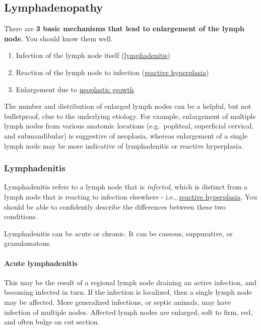 \documentclass[openany]{article}
\providecommand{\tightlist}{%
  \setlength{\itemsep}{0pt}\setlength{\parskip}{0pt}}
\let\oldparagraph\paragraph
\renewcommand{\paragraph}[1]{\oldparagraph{#1}\mbox{}}
\begin{document}
\subsection{Lymphadenopathy}\label{lymphadenopathy}

There are \textbf{3 basic mechanisms that lead to enlargement of the
lymph node}. You should know them well.

\begin{enumerate}
\def\labelenumi{\arabic{enumi}.}
\tightlist
\item
  Infection of the lymph node itself
  (\protect\hyperlink{lymphadenitis}{lymphadenitis})
\item
  Reaction of the lymph node to infection
  (\protect\hyperlink{reactive-hyperplasia}{reactive hyperplasia})
\item
  Enlargement due to \protect\hyperlink{neoplasia-1}{neoplastic growth}
\end{enumerate}

The number and distribution of enlarged lymph nodes can be a helpful,
but not bulletproof, clue to the underlying etiology. For example,
enlargement of multiple lymph nodes from various anatomic locations
(e.g.~popliteal, superficial cervical, and submandibular) is suggestive
of neoplasia, whereas enlargement of a single lymph node may be more
indicative of lymphadenitis or reactive hyperplasia.

\hypertarget{lymphadenitis}{\subsubsection{Lymphadenitis}\label{lymphadenitis}}

Lymphadenitis refers to a lymph node that is \emph{infected}, which is
distinct from a lymph node that is reacting to infection elsewhere -
i.e., \protect\hyperlink{reactive-hyperplasia}{reactive hyperplasia}.
You should be able to confidently describe the differences between these
two conditions.

Lymphadenitis can be acute or chronic. It can be caseous, suppurative,
or granulomatous.

\paragraph{Acute lymphadenitis}\label{acute-lymphadenitis}

This may be the result of a regional lymph node draining an active
infection, and becoming infected in turn. If the infection is localized,
then a single lymph node may be affected. More generalized infections,
or septic animals, may have infection of multiple nodes. Affected lymph
nodes are enlarged, soft to firm, red, and often bulge on cut section.
\end{document}
